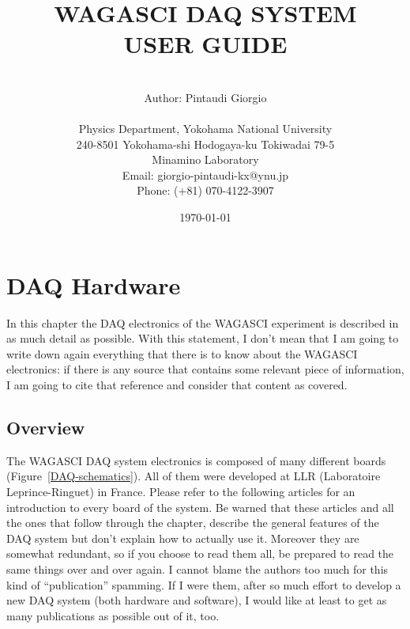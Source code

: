 \title{WAGASCI DAQ SYSTEM\\USER GUIDE}
\author{\\Author: Pintaudi Giorgio\\\\
  Physics Department, Yokohama National University\\
  240-8501 Yokohama-shi Hodogaya-ku Tokiwadai 79-5\\ %
  Minamino Laboratory\\
  Email: giorgio-pintaudi-kx@ynu.jp\\
  Phone: (+81) 070-4122-3907\\} \date{\today}
\maketitle
\newpage

\tableofcontents\label{c}
\newpage


\chapter{DAQ Hardware}
In this chapter the DAQ electronics of the WAGASCI experiment is described in as
much detail as possible. With this statement, I don't mean that I am going to
write down again everything that there is to know about the WAGASCI electronics:
if there is any source that contains some relevant piece of information, I am
going to cite that reference and consider that content as covered.

\section{Overview}\label{sec:overview}
The WAGASCI DAQ system electronics is composed of many different boards
(Figure~\ref{DAQ-schematics}). All of them were developed at LLR (Laboratoire
Leprince-Ringuet) in France. Please refer to the following articles for an
introduction to every board of the
system\cite{Gastaldi:2014vaa,Gastaldi:2014oid}.  Be warned that these articles
and all the ones that follow through the chapter, describe the general features
of the DAQ system but don't explain how to actually use it. Moreover they are
somewhat redundant, so if you choose to read them all, be prepared to read the
same things over and over again. I cannot blame the authors too much for this
kind of ``publication'' spamming. If I were them, after so much effort to
develop a new DAQ system (both hardware and software), I would like at least to
get as many publications as possible out of it, too.

